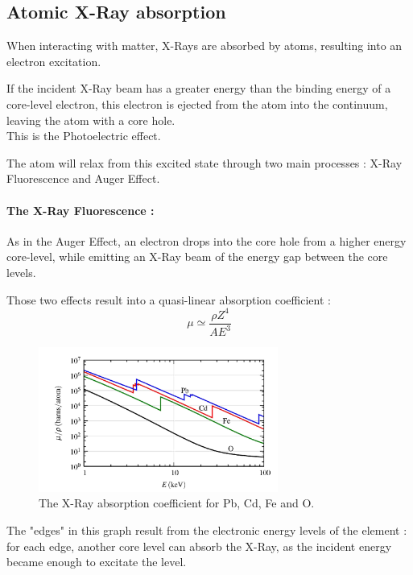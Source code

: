 \documentclass[11pt,a4paper,oneside]{report}
\begin{document}
\subsection{Atomic X-Ray absorption}

When interacting with matter, X-Rays are absorbed by atoms, resulting into an electron excitation.

If the incident X-Ray beam has a greater energy than the binding energy of a core-level electron, this electron is ejected from the atom into the continuum, leaving the atom with a core hole\cite{Pres}.\\This is the Photoelectric effect.

The atom will relax from this excited state through two main processes : X-Ray Fluorescence and Auger Effect.

\paragraph{The X-Ray Fluorescence :} As in the Auger Effect, an electron drops into the core hole from a higher energy core-level, while emitting an X-Ray beam of the energy gap between the core levels.

Those two effects result into a quasi-linear absorption coefficient :
\[\mu \simeq \frac{\rho Z^4}{A E^3}\]
\begin{figure}[H]
    \begin{center}
        \includegraphics[width=0.7\textwidth]{Images/AbsorptionCoeff}
        \caption{The X-Ray absorption coefficient for Pb, Cd, Fe and O.}
        \label{absorptionCoeff}
    \end{center}
\end{figure}

The "edges" in this graph result from the electronic energy levels of the element : for each edge, another core level can absorb the X-Ray, as the incident energy became enough to excitate the level.
\end{document}
